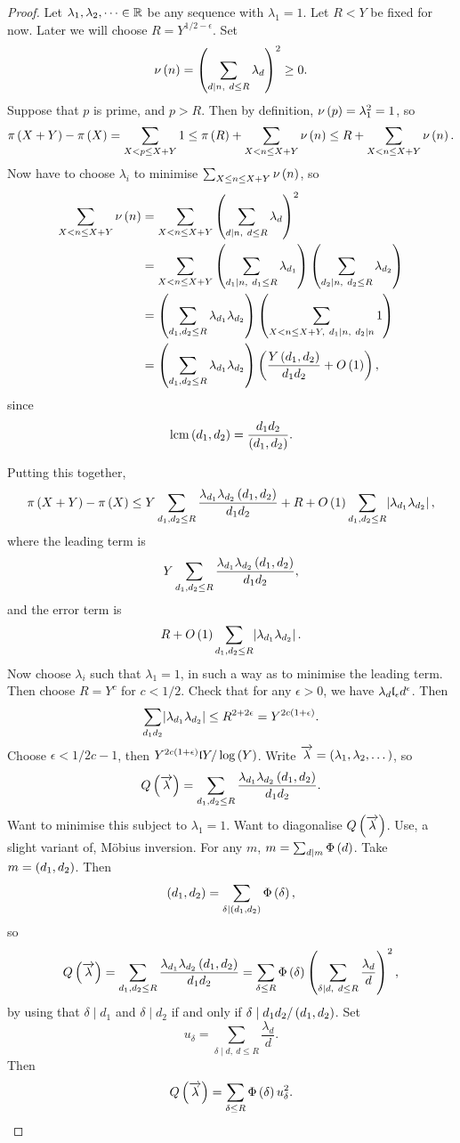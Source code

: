 \begin{proof}
Let $ \lambda_1, \lambda_2, \dots \in \mathbb{R} $ be any sequence with $ \lambda_1 = 1 $. Let $ R < Y $ be fixed for now. Later we will choose $ R = Y^{1 / 2 - \epsilon} $. Set
$$ \nu\br{n} = \br{\sum_{d \mid n, \ d \le R} \lambda_d}^2 \ge 0. $$
Suppose that $ p $ is prime, and $ p > R $. Then by definition, $ \nu\br{p} = \lambda_1^2 = 1 $, so
$$ \pi\br{X + Y} - \pi\br{X} = \sum_{X < p \le X + Y} 1 \le \pi\br{R} + \sum_{X < n \le X + Y} \nu\br{n} \le R + \sum_{X < n \le X + Y} \nu\br{n}. $$
Now have to choose $ \lambda_i $ to minimise $ \sum_{X \le n \le X + Y} \nu\br{n} $, so
\begin{align*}
\sum_{X < n \le X + Y} \nu\br{n}
& = \sum_{X < n \le X + Y} \br{\sum_{d \mid n, \ d \le R} \lambda_d}^2 \\
& = \sum_{X < n \le X + Y} \br{\sum_{d_1 \mid n, \ d_1 \le R} \lambda_{d_1}}\br{\sum_{d_2 \mid n, \ d_2 \le R} \lambda_{d_2}} \\
& = \br{\sum_{d_1, d_2 \le R} \lambda_{d_1}\lambda_{d_2}}\br{\sum_{X < n \le X + Y, \ d_1 \mid n, \ d_2 \mid n} 1} \\
& = \br{\sum_{d_1, d_2 \le R} \lambda_{d_1}\lambda_{d_2}}\br{\dfrac{Y\br{d_1, d_2}}{d_1d_2} + O\br{1}},
\end{align*}
since
$$ \mathrm{lcm}\br{d_1, d_2} = \dfrac{d_1d_2}{\br{d_1, d_2}}. $$

\pagebreak

Putting this together,
$$ \pi\br{X + Y} - \pi\br{X} \le Y\sum_{d_1, d_2 \le R} \dfrac{\lambda_{d_1}\lambda_{d_2}\br{d_1, d_2}}{d_1d_2} + R + O\br{1}\sum_{d_1, d_2 \le R} \abs{\lambda_{d_1}\lambda_{d_2}}, $$
where the leading term is
$$ Y\sum_{d_1, d_2 \le R} \dfrac{\lambda_{d_1}\lambda_{d_2}\br{d_1, d_2}}{d_1d_2}, $$
and the error term is
$$ R + O\br{1}\sum_{d_1, d_2 \le R} \abs{\lambda_{d_1}\lambda_{d_2}}. $$
Now choose $ \lambda_i $ such that $ \lambda_1 = 1 $, in such a way as to minimise the leading term. Then choose $ R = Y^c $ for $ c < 1 / 2 $. Check that for any $ \epsilon > 0 $, we have $ \lambda_d \l_\epsilon d^\epsilon $. Then
$$ \sum_{d_1d_2} \abs{\lambda_{d_1}\lambda_{d_2}} \le R^{2 + 2\epsilon} = Y^{2c\br{1 + \epsilon}}. $$
Choose $ \epsilon < 1 / 2c - 1 $, then $ Y^{2c\br{1 + \epsilon}} \l Y / \log\br{Y} $. Write $ \overrightarrow{\lambda} = \br{\lambda_1, \lambda_2, \dots} $, so
$$ Q\br{\overrightarrow{\lambda}} = \sum_{d_1, d_2 \le R} \dfrac{\lambda_{d_1}\lambda_{d_2}\br{d_1, d_2}}{d_1d_2}. $$
Want to minimise this subject to $ \lambda_1 = 1 $. Want to diagonalise $ Q\br{\overrightarrow{\lambda}} $. Use, a slight variant of, M\"obius inversion. For any $ m $, $ m = \sum_{d \mid m} \Phi\br{d} $. Take $ m = \br{d_1, d_2} $. Then
$$ \br{d_1, d_2} = \sum_{\delta \mid \br{d_1, d_2}} \Phi\br{\delta}, $$
so
$$ Q\br{\overrightarrow{\lambda}} = \sum_{d_1, d_2 \le R} \dfrac{\lambda_{d_1}\lambda_{d_2}\br{d_1, d_2}}{d_1d_2} = \sum_{\delta \le R} \Phi\br{\delta}\br{\sum_{\delta \mid d, \ d \le R} \dfrac{\lambda_d}{d}}^2, $$
by using that $ \delta \mid d_1 $ and $ \delta \mid d_2 $ if and only if $ \delta \mid d_1d_2 / \br{d_1, d_2} $. Set
$$ u_\delta = \sum_{\delta \mid d, \ d \le R} \dfrac{\lambda_d}{d}. $$
Then
$$ Q\br{\overrightarrow{\lambda}} = \sum_{\delta \le R} \Phi\br{\delta}u_\delta^2. $$


\end{proof}
